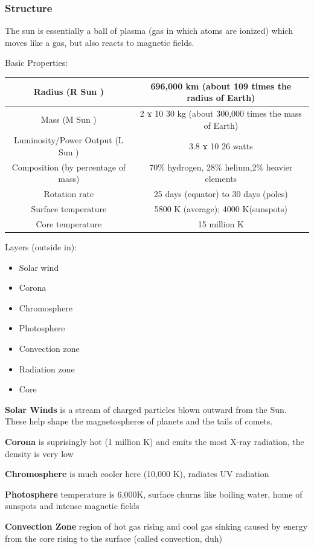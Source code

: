 \subsubsection{Structure}
The sun is essentially a ball of plasma (gas in which atoms are ionized) which moves like a gas, but also reacts to magnetic fields.

Basic Properties:\\
\begin{tabular}{|c|c|}
\hline
Radius (R Sun ) & 696,000 km (about 109 times the radius of Earth)\\
\hline
Mass (M Sun )  & 2 ϫ 10 30 kg (about 300,000 times the mass of Earth)\\
\hline
Luminosity/Power Output (L Sun ) & 3.8 ϫ 10 26 watts\\
\hline
Composition (by percentage of mass) & 70\% hydrogen, 28\% helium,2\% heavier elements\\
\hline
Rotation rate & 25 days (equator) to 30 days (poles)\\
\hline
Surface temperature & 5800 K (average); 4000 K(sunspots)\\
\hline
Core temperature & 15 million K\\
\hline
\end{tabular}

Layers (outside in):
\begin{itemize}
\item Solar wind
\item Corona
\item Chromosphere
\item Photosphere
\item Convection zone
\item Radiation zone
\item Core
\end{itemize}
\textbf{Solar Winds} is a stream of charged particles blown outward from the Sun. These help shape the magnetospheres of planets and the tails of comets.

\textbf{Corona} is suprisingly hot (1 million K) and emits the most X-ray radiation, the density is very low

\textbf{Chromosphere} is much cooler here (10,000 K), radiates UV radiation

\textbf{Photosphere} temperature is 6,000K, surface churns like boiling water, home of sunspots and intense magnetic fields

\textbf{Convection Zone} region of hot gas rising and cool gas sinking caused by energy from the core rising to the surface (called convection, duh)

